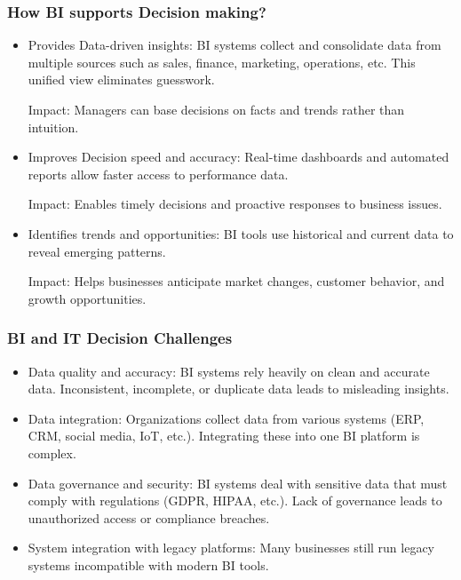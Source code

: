 \subsubsection{How BI supports Decision making?}

\begin{itemize}
    \item Provides Data-driven insights: BI systems collect and consolidate data from multiple sources such as sales, finance, marketing, operations, etc. This unified view eliminates guesswork.
        
        Impact: Managers can base decisions on facts and trends rather than intuition.
    \item Improves Decision speed and accuracy: Real-time dashboards and automated reports allow faster access to performance data.
        
        Impact: Enables timely decisions and proactive responses to business issues.
    \item Identifies trends and opportunities: BI tools use historical and current data to reveal emerging patterns.
        
        Impact: Helps businesses anticipate market changes, customer behavior, and growth opportunities.
\end{itemize}

\subsubsection{BI and IT Decision Challenges}

\begin{itemize}
    \item Data quality and accuracy: BI systems rely heavily on clean and accurate data. Inconsistent, incomplete, or duplicate data leads to misleading insights.
    \item Data integration: Organizations collect data from various systems (ERP, CRM, social media, IoT, etc.). Integrating these into one BI platform is complex.
    \item Data governance and security: BI systems deal with sensitive data that must comply with regulations (GDPR, HIPAA, etc.). Lack of governance leads to unauthorized access or compliance breaches.
    \item System integration with legacy platforms: Many businesses still run legacy systems incompatible with modern BI tools.
\end{itemize}

